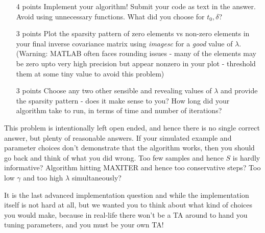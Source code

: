 \begin{itemize}
\item [4 points] Implement your algorithm! Submit your code as text in the answer. Avoid using unnecessary functions. What did you choose for $t_0, \delta$?

\item [3 points] Plot the sparsity pattern of zero elements vs non-zero elements in your final inverse covariance matrix using \textit{imagesc} for a \textit{good} value of $\lambda$. (Warning: MATLAB often faces rounding issues - many of the elements may be zero upto very high precision but appear nonzero in your plot - threshold them at some tiny value to avoid this problem)

\item [3 points] Choose any two other sensible and revealing values of $\lambda$ and provide the sparsity pattern - does it make sense to you? How long did your algorithm take to run, in terms of time and number of iterations?
\end{itemize}

This problem is intentionally left open ended, and hence there is no single correct answer, but plenty of reasonable answers. If your simulated example and parameter choices don't demonstrate that the algorithm works, then you should go back and think of what you did wrong. Too few samples and hence $S$ is hardly informative? Algorithm hitting MAXITER and hence too conservative steps? Too low $\gamma$ and too high $\lambda$ simultaneously? 

It is the last advanced implementation question and while the implementation itself is not hard at all, but we wanted you to think about what kind of choices you would make, because in real-life there won't be a TA around to hand you tuning parameters, and you must be your own TA!